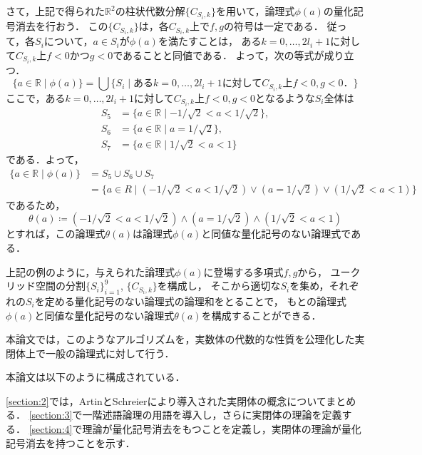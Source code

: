 \documentclass[uplatex, dvipdfmx]{jsarticle}
\numberwithin{equation}{section}
\newcommand{\R}{\mathbb{R}}
\theoremstyle{definition}
\begin{document}
     さて，上記で得られた$\R^2$の柱状代数分解$\{C_{S_i,k}\}$を用いて，論理式$\phi(a)$の量化記号消去を行おう．
     この$\{C_{S_i,k}\}$は，各$C_{S_i,k}$上で$f, g$の符号は一定である．
     従って，各$S_i$について，$a \in S_i$が$\phi(a)$を満たすことは，
     ある$k=0, \dots, 2l_i+1$に対して$C_{S_i,k}$上$f<0$かつ$g<0$であることと同値である．
     よって，次の等式が成り立つ．
     \begin{equation}
          \{a \in \R \mid \phi(a)\} = \bigcup\{S_i \mid \text{ある$k=0, \dots, 2l_i+1$に対して$C_{S_i,k}$上$f<0, g<0$．}\}
     \end{equation}
     ここで，ある$k=0, \dots, 2l_i+1$に対して$C_{S_i,k}$上$f<0, g<0$となるような$S_i$全体は
     \begin{align}
          S_5 &= \{a \in \R \mid -1/\sqrt{2} < a < 1/\sqrt{2}\},\\
          S_6 &= \{a \in \R \mid  a = 1/\sqrt{2}\},\\
          S_7 &= \{a \in \R \mid  1/\sqrt{2} < a < 1\}
     \end{align}
     である．よって，
     \begin{align}
          \{a \in \R \mid \phi(a)\} 
               &= S_5 \cup S_6 \cup S_7\\
               &= \{a \in R \mid (-1/\sqrt{2} < a < 1/\sqrt{2}) \lor (a = 1/\sqrt{2}) \lor (1/\sqrt{2} < a < 1)\}
     \end{align}
     であるため，
     \begin{equation}
          \theta(a) \coloneqq (-1/\sqrt{2} < a < 1/\sqrt{2}) \land (a = 1/\sqrt{2}) \land (1/\sqrt{2} < a < 1)
     \end{equation}
     とすれば，この論理式$\theta(a)$は論理式$\phi(a)$と同値な量化記号のない論理式である．

     上記の例のように，与えられた論理式$\phi(a)$に登場する多項式$f,g$から，
     ユークリッド空間の分割$\{S_i\}_{i=1}^9$, $\{C_{S_i,k}\}$を構成し，
     そこから適切な$S_i$を集め，それぞれの$S_i$を定める量化記号のない論理式の論理和をとることで，
     もとの論理式$\phi(a)$と同値な量化記号のない論理式$\theta(a)$を構成することができる．

     本論文では，このようなアルゴリズムを，実数体の代数的な性質を公理化した実閉体上で一般の論理式に対して行う．

     本論文は以下のように構成されている．%

     \cref{section:2}では，ArtinとSchreierにより導入された実閉体の概念についてまとめる．
     \cref{section:3}で一階述語論理の用語を導入し，さらに実閉体の理論を定義する．
     \cref{section:4}で理論が量化記号消去をもつことを定義し，実閉体の理論が量化記号消去を持つことを示す．
     
\end{document}
